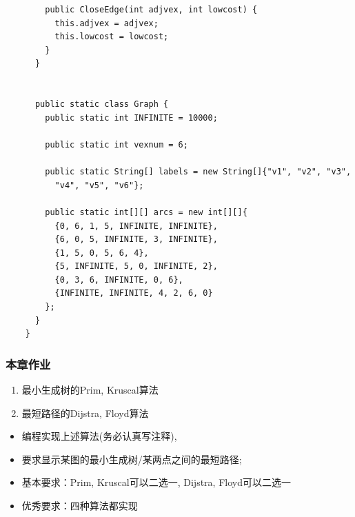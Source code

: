 \begin{frame}
\begin{verbatim}
        public CloseEdge(int adjvex, int lowcost) {
          this.adjvex = adjvex;
          this.lowcost = lowcost;
        }
      }


      public static class Graph {
        public static int INFINITE = 10000;

        public static int vexnum = 6;

        public static String[] labels = new String[]{"v1", "v2", "v3",
          "v4", "v5", "v6"};

        public static int[][] arcs = new int[][]{
          {0, 6, 1, 5, INFINITE, INFINITE},
          {6, 0, 5, INFINITE, 3, INFINITE},
          {1, 5, 0, 5, 6, 4},
          {5, INFINITE, 5, 0, INFINITE, 2},
          {0, 3, 6, INFINITE, 0, 6},
          {INFINITE, INFINITE, 4, 2, 6, 0}
        };
      }
    }
  \end{verbatim}
\end{frame}


\begin{frame}[fragile]
  \frametitle{本章作业}
  \begin{enumerate}
  \item 最小生成树的Prim, Kruscal算法
  \item 最短路径的Dijstra, Floyd算法
  \end{enumerate}

  \begin{itemize}
  \item 编程实现上述算法(务必认真写注释),
  \item 要求显示某图的最小生成树/某两点之间的最短路径;
  \item 基本要求：Prim, Kruscal可以二选一, Dijstra, Floyd可以二选一
  \item 优秀要求：四种算法都实现
  \end{itemize}
\end{frame}